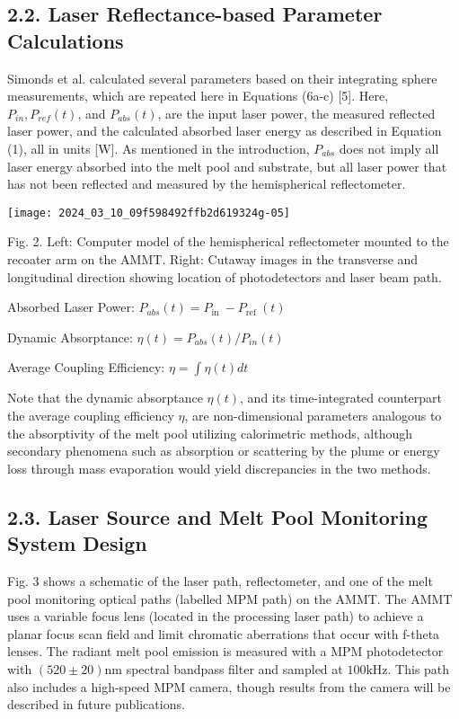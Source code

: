 \documentclass[10pt]{article}
\begin{document}
\subsection*{2.2. Laser Reflectance-based Parameter Calculations}
Simonds et al. calculated several parameters based on their integrating sphere measurements, which are repeated here in Equations (6a-c) [5]. Here, $P_{i n}, P_{r e f}(t)$, and $P_{a b s}(t)$, are the input laser power, the measured reflected laser power, and the calculated absorbed laser energy as described in Equation (1), all in units [W]. As mentioned in the introduction, $P_{a b s}$ does not imply all laser energy absorbed into the melt pool and substrate, but all laser power that has not been reflected and measured by the hemispherical reflectometer.

\begin{center}
\texttt{[image: 2024\_03\_10\_09f598492ffb2d619324g-05]}
\end{center}

Fig. 2. Left: Computer model of the hemispherical reflectometer mounted to the recoater arm on the AMMT. Right: Cutaway images in the transverse and longitudinal direction showing location of photodetectors and laser beam path.

Absorbed Laser Power: $P_{a b s}(t)=P_{\text {in }}-P_{\text {ref }}(t)$

Dynamic Absorptance: $\eta(t)=P_{a b s}(t) / P_{i n}(t)$

Average Coupling Efficiency: $\eta=\int \eta(t) d t$

Note that the dynamic absorptance $\eta(t)$, and its time-integrated counterpart the average coupling efficiency $\eta$, are non-dimensional parameters analogous to the absorptivity of the melt pool utilizing calorimetric methods, although secondary phenomena such as absorption or scattering by the plume or energy loss through mass evaporation would yield discrepancies in the two methods.

\subsection*{2.3. Laser Source and Melt Pool Monitoring System Design}
Fig. 3 shows a schematic of the laser path, reflectometer, and one of the melt pool monitoring optical paths (labelled MPM path) on the AMMT. The AMMT uses a variable focus lens (located in the processing laser path) to achieve a planar focus scan field and limit chromatic aberrations that occur with f-theta lenses. The radiant melt pool emission is measured with a MPM photodetector with $(520 \pm 20) \mathrm{nm}$ spectral bandpass filter and sampled at $100 \mathrm{kHz}$. This path also includes a high-speed MPM camera, though results from the camera will be described in future publications.
\end{document}
